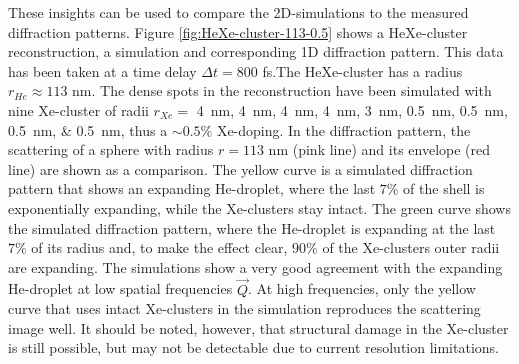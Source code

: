 These insights can be used to compare the 2D-simulations to the measured diffraction patterns. Figure \ref{fig:HeXe-cluster-113-0.5} shows a HeXe-cluster reconstruction, a simulation and corresponding 1D diffraction pattern. This data has been taken at a time delay $\Delta t=800$ fs.The HeXe-cluster has a radius $r_{He}\approx 113$ nm. The dense spots in the reconstruction have been simulated with nine Xe-cluster of radii $r_{Xe}=$ \SIlist{4;4;4;4;3;0.5;0.5;0.5;0.5}{\nano\meter}, thus a $\sim 0.5 \%$ Xe-doping. In the diffraction pattern, the scattering of a sphere with radius $r=113$ nm (pink line) and its envelope (red line) are shown as a comparison. The yellow curve is a simulated diffraction pattern that shows an expanding He-droplet, where the last $7 \%$ of the shell is exponentially expanding, while the Xe-clusters stay intact. The green curve shows the simulated diffraction pattern, where the He-droplet is expanding at the last $7 \%$ of its radius and, to make the effect clear, $90 \%$ of the Xe-clusters outer radii are expanding. The simulations show a very good agreement with the expanding He-droplet at low spatial frequencies $\vec{Q}$. At high frequencies, only the yellow curve that uses intact Xe-clusters in the simulation reproduces the scattering image well. It should be noted, however, that structural damage in the Xe-cluster is still possible, but may not be detectable due to current resolution limitations.
%
%
%
